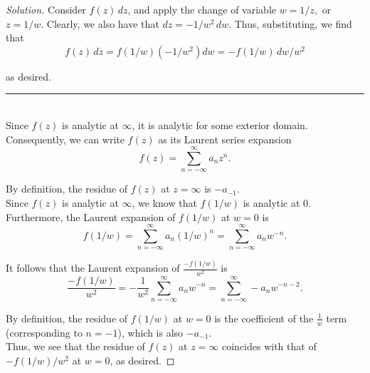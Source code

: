 \documentclass[11pt]{article}
\newenvironment{solution}
  {\renewcommand\qedsymbol{$\blacksquare$}\begin{proof}[Solution]}
  {\end{proof}}
\theoremstyle{definition}
\begin{document}
\begin{solution} Consider $f(z) \, dz$, and apply the change of variable $w=1/z,$ or $z=1/w.$ Clearly, we also have that $dz = -1/w^2 \, dw.$ Thus, substituting, we find that
\[ f(z) \, dz = f\left( 1/w \right) \left(  -1/w^2 \right) dw = -f\left( 1/w\right) \, dw/w^2\]

as desired. 

\noindent\rule{\textwidth}{1pt} \\

Since $f(z)$ is analytic at $\infty$, it is analytic for some exterior domain. Consequently, we can write $f(z)$ as its Laurent series expansion
\[ f(z) = \sum\limits_{n = -\infty}^{\infty} a_n z^n. \]

By definition, the residue of $f(z)$ at $z = \infty$ is $-a_{-1}.$ \\

Since $f(z)$ is analytic at $\infty$, we know that $f(1/w)$ is analytic at $0$. Furthermore, the Laurent expansion of $f(1/w)$ at $w=0$ is
\[ f(1/w) = \sum\limits_{n = -\infty}^{\infty} a_n \left(1/w\right)^n = \sum\limits_{n = -\infty}^{\infty} a_n w^{-n}. \]

It follows that the Laurent expansion of $\frac{-f\left( 1/w\right)}{w^2}$ is
\[ \frac{-f\left( 1/w\right)}{w^2} = -\frac{1}{w^2}\sum\limits_{n = -\infty}^{\infty} a_n w^{-n} = \sum\limits_{n=-\infty}^{\infty} -a_n w^{-n-2}.\]

By definition, the residue of $f(1/w)$ at $w=0$ is the coefficient of the $\frac{1}{w}$ term (corresponding to $n= -1$), which is also $-a_{-1}.$ \\

Thus, we see that the residue of $f(z)$ at $z = \infty$ coincides with that of $-f(1/w)/w^2$ at $w=0$, as desired. \end{solution}
\end{document}
